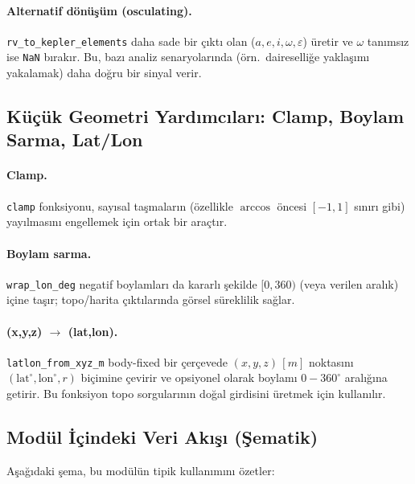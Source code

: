 \paragraph{Alternatif dönüşüm (osculating).}
\texttt{rv\_to\_kepler\_elements} daha sade bir çıktı olan (\(a,e,i,\omega,\varepsilon\)) üretir ve \(\omega\) tanımsız ise \texttt{NaN} bırakır. Bu, bazı analiz senaryolarında (örn.\ daireselliğe yaklaşımı yakalamak) daha doğru bir sinyal verir. 

\subsection*{Küçük Geometri Yardımcıları: Clamp, Boylam Sarma, Lat/Lon}
\paragraph{Clamp.}
\texttt{clamp} fonksiyonu, sayısal taşmaların (özellikle \(\arccos\) öncesi \([-1,1]\) sınırı gibi) yayılmasını engellemek için ortak bir araçtır. 

\paragraph{Boylam sarma.}
\texttt{wrap\_lon\_deg} negatif boylamları da kararlı şekilde \([0,360)\) (veya verilen aralık) içine taşır; topo/harita çıktılarında görsel süreklilik sağlar. 

\paragraph{(x,y,z) $\rightarrow$ (lat,lon).}
\texttt{latlon\_from\_xyz\_m} body-fixed bir çerçevede \((x,y,z)\,[m]\) noktasını \((\text{lat}^\circ,\text{lon}^\circ,r)\) biçimine çevirir ve opsiyonel olarak boylamı \(0\!-\!360^\circ\) aralığına getirir. Bu fonksiyon topo sorgularının doğal girdisini üretmek için kullanılır.

\subsection*{Modül İçindeki Veri Akışı (Şematik)}
Aşağıdaki şema, bu modülün tipik kullanımını özetler:

\begin{center}
\end{center}



